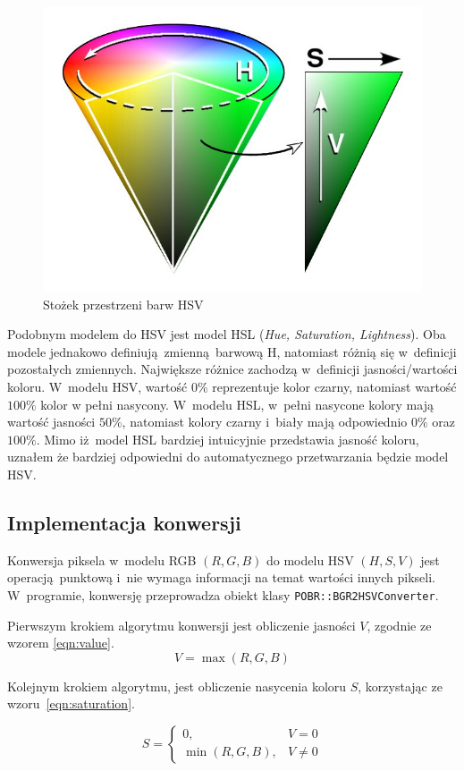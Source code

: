\begin{figure}[h]
    \centering
    \includegraphics[width=0.6\columnwidth]{./figures/HSV_cone.jpg}
    \caption{Stożek przestrzeni barw HSV~\cite{WikipediaPL:hsvCone}}
    \label{fig:hsv}
\end{figure}   

Podobnym modelem do HSV jest model HSL (\textit{Hue, Saturation, Lightness}). Oba modele jednakowo definiują zmienną barwową H, natomiast różnią się w~definicji pozostałych zmiennych. Największe różnice zachodzą w~definicji jasności/wartości koloru. W~modelu HSV, wartość $0\%$ reprezentuje kolor czarny, natomiast wartość $100\%$ kolor w pełni nasycony. W~modelu HSL, w~pełni nasycone kolory mają wartość jasności $50\%$, natomiast kolory czarny i~biały mają odpowiednio $0\%$ oraz $100\%$. Mimo iż model HSL bardziej intuicyjnie przedstawia jasność koloru, uznałem że bardziej odpowiedni do automatycznego przetwarzania będzie model HSV.

\subsection{Implementacja konwersji}
Konwersja piksela w~modelu RGB $(R, G, B)$ do modelu HSV $(H,S,V)$ jest operacją punktową i~nie wymaga informacji na temat wartości innych pikseli. W~programie, konwersję przeprowadza obiekt klasy \texttt{POBR::BGR2HSVConverter}. 

Pierwszym krokiem algorytmu konwersji jest obliczenie jasności $V$, zgodnie ze wzorem \ref{eqn:value}.
\smallskip
\begin{equation}
    \label{eqn:value}
    V = \max{(R, G, B)}
\end{equation}

Kolejnym krokiem algorytmu, jest obliczenie nasycenia koloru $S$, korzystając ze wzoru~\ref{eqn:saturation}.

\begin{equation}
    \label{eqn:saturation}
    S = \left\{ 
        \begin{array}{ll}
            0, & V = 0 \\
            \min{(R, G, B)}, & V \ne 0
        \end{array} 
        \right.
\end{equation}

